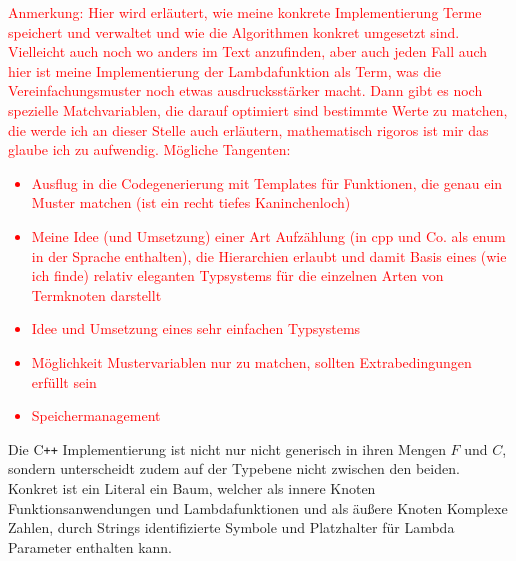 \documentclass{scrartcl}
\numberwithin{figure}{section} %
\theoremstyle{definition} %
\begin{document}
\textcolor{red} {
\begin{itshape}
Anmerkung: Hier wird erläutert, wie meine konkrete Implementierung Terme speichert und verwaltet und wie die Algorithmen konkret umgesetzt sind. Vielleicht auch noch wo anders im Text anzufinden, aber auch jeden Fall auch hier ist meine Implementierung der Lambdafunktion als Term, was die Vereinfachungsmuster noch etwas ausdrucksstärker macht. Dann gibt es noch spezielle Matchvariablen, die darauf optimiert sind bestimmte Werte zu matchen, die werde ich an dieser Stelle auch erläutern, mathematisch rigoros ist mir das glaube ich zu aufwendig.
Mögliche Tangenten:
\begin{itemize}
\item {Ausflug in die Codegenerierung mit Templates für Funktionen, die genau ein Muster matchen (ist ein recht tiefes Kaninchenloch)}
\item {Meine Idee (und Umsetzung) einer Art Aufzählung (in cpp und Co. als enum in der Sprache enthalten), die Hierarchien erlaubt und damit Basis eines (wie ich finde) relativ eleganten Typsystems für die einzelnen Arten von Termknoten darstellt}
\item {Idee und Umsetzung eines sehr einfachen Typsystems}
\item{Möglichkeit Mustervariablen nur zu matchen, sollten Extrabedingungen erfüllt sein}
\item {Speichermanagement}
\end{itemize}
\end{itshape}
}

Die C\texttt{++} Implementierung ist nicht nur nicht generisch in ihren Mengen $F$ und $C$, sondern unterscheidt zudem auf der Typebene nicht zwischen den beiden. Konkret ist ein Literal ein Baum, welcher als innere Knoten Funktionsanwendungen und Lambdafunktionen und als äußere Knoten Komplexe Zahlen, durch Strings identifizierte Symbole und Platzhalter für Lambda Parameter enthalten kann. 
\end{document}

